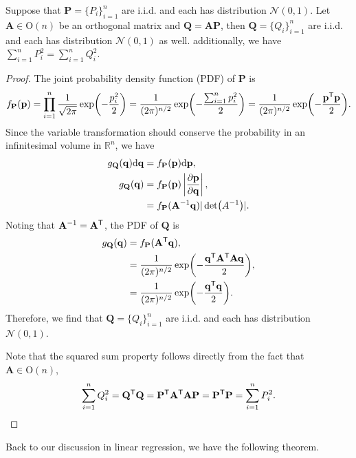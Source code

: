 \documentclass{book}
\begin{document}
\lemma
\label{lma:SLR:multi-normal-tf}
Suppose that $\mathbf{P} = \{P_i\}_{i=1}^n$ are i.i.d. and each has distribution $\mathcal{N}(0,1)$. Let $\mathbf{A} \in \mathrm{O}(n)$ be an orthogonal matrix and $\mathbf{Q} = \mathbf{A} \mathbf{P}$, then $\mathbf{Q} = \{Q_i\}_{i=1}^n$ are i.i.d. and each has distribution $\mathcal{N}(0,1)$ as well. additionally, we have $\sum_{i=1}^{n}P_i^2 = \sum_{i=1}^{n}Q_i^2$.
\begin{proof}
The joint probability density function (PDF) of $\mathbf{P}$ is 
\begin{align*}
    f_{\mathbf{P}}(\mathbf{p}) = \prod_{i=1}^n\frac{1}{\sqrt{2\pi}}\exp(-\frac{p_i^2}{2}) = \frac{1}{({2\pi})^{n/2}}\exp(-\frac{\sum_{i=1}^np_i^2}{2}) = \frac{1}{({2\pi})^{n/2}}\exp(-\frac{\mathbf{p}^{\mathsf{T}}\mathbf{p}}{2}).
\end{align*}
Since the variable transformation should conserve the probability in an infinitesimal volume in $\mathbb{R}^{n}$, we have
\begin{align*}
    g_{\mathbf{Q}}(\mathbf{q})\dd\mathbf{q} &= f_{\mathbf{P}}(\mathbf{p})\dd\mathbf{p},\\
    g_{\mathbf{Q}}(\mathbf{q}) &= f_{\mathbf{P}}(\mathbf{p}) \left|\pdv{\mathbf{p}}{\mathbf{q}}\right|,\\
    &= f_{\mathbf{P}}(\mathbf{A}^{-1}\mathbf{q}) |\det(A^{-1})|.
\end{align*}
Noting that $\mathbf{A}^{-1} = \mathbf{A}^{\mathsf{T}}$, the PDF of $\mathbf{Q}$ is
\begin{align*}
    g_\mathbf{Q}(\mathbf{q}) &= f_{\mathbf{P}}(\mathbf{A}^{\mathsf{T}}\mathbf{q}),\\
    &= \frac{1}{({2\pi})^{n/2}}\exp(-\frac{\mathbf{q}^{\mathsf{T}}\mathbf{A}^{\mathsf{T}}\mathbf{A}\mathbf{q}}{2}),\\
    &= \frac{1}{({2\pi})^{n/2}}\exp(-\frac{\mathbf{q}^{\mathsf{T}}\mathbf{q}}{2}).
\end{align*}
Therefore, we find that $\mathbf{Q} = \{Q_i\}_{i=1}^n$ are i.i.d. and each has distribution $\mathcal{N}(0,1)$.

Note that the squared sum property follows directly from the fact that $\mathbf{A}\in\mathrm{O}(n)$,
\begin{align*}
    \sum_{i=1}^{n}Q_i^2 = \mathbf{Q}^{\mathsf{T}} \mathbf{Q} = \mathbf{P}^{\mathsf{T}} \mathbf{A}^{\mathsf{T}} \mathbf{A} \mathbf{P} = \mathbf{P}^{\mathsf{T}} \mathbf{P} = \sum_{i=1}^{n}P_i^2.
\end{align*}
\end{proof}

Back to our discussion in linear regression, we have the following theorem.
\end{document}
